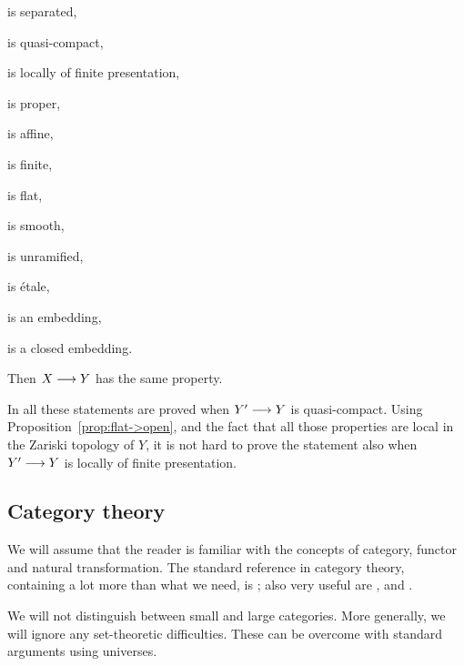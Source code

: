 \begin{1   PRELIMINARY NOTIONS}
\begin{1.1 Algebraic geometry}
\begin{proposition}
\begin{enumeratei}
\item is separated,

\item is quasi-compact,

\item is locally of finite presentation,

\item is proper,

\item is affine,

\item is finite,

\item is flat,

\item is smooth, 

\item is unramified,

\item is \'etale,

\item is an embedding,

\item is a closed embedding.

\end{enumeratei}

Then $X \arr Y$ has the same property.
\end{proposition}

In \cite{ega4-2} all these statements are proved when $Y' \arr Y$ is quasi-compact. Using Proposition~\ref{prop:flat->open}, and the fact that all those properties are local in the Zariski topology of $Y$, it is not hard to prove the statement also when $Y' \arr Y$ is locally of finite presentation.


\end{1.1 Algebraic geometry}
\begin{1.2 Category theory}
\setcounter{section}{1}
\section{Category theory}


We will assume that the reader is familiar with the concepts of category, functor and natural transformation. The standard reference in category theory, containing a lot more than what we need, is \cite{maclane98}; also very useful are \cite{borceux1}, \cite{borceux2} and \cite{borceux3}.

We will not distinguish between small and large categories. More generally, we will ignore any set-theoretic difficulties. These can be overcome with standard arguments using universes.


\end{1.2 Category theory}
\end{1   PRELIMINARY NOTIONS}
